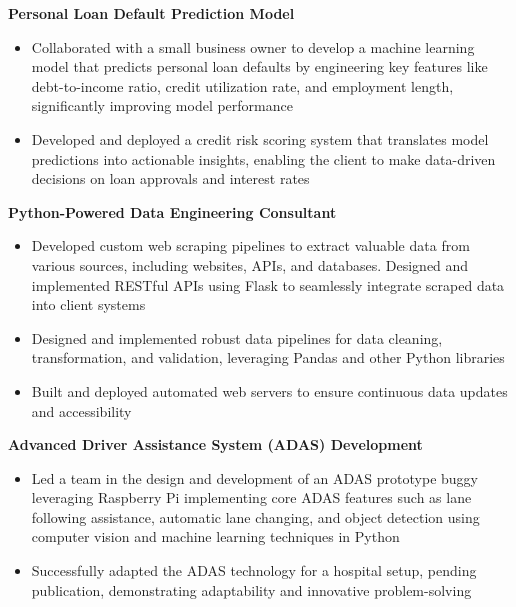 \documentclass[11pt]{article}       %
\begin{document}
\textbf{Personal Loan Default Prediction Model} \\
\vspace{-9pt}
\begin{itemize}
  \item Collaborated with a small business owner to develop a machine learning model that predicts personal loan defaults by engineering key features like debt-to-income ratio, credit utilization rate, and employment length, significantly improving model performance
  \item Developed and deployed a credit risk scoring system that translates model predictions into actionable insights, enabling the client to make data-driven decisions on loan approvals and interest rates
\end{itemize}
\textbf{Python-Powered Data Engineering Consultant} \\
\vspace{-9pt}
\begin{itemize}
  \item Developed custom web scraping pipelines to extract valuable data from various sources, including websites, APIs, and databases. Designed and implemented RESTful APIs using Flask to seamlessly integrate scraped data into client systems
  \item Designed and implemented robust data pipelines for data cleaning, transformation, and validation, leveraging Pandas and other Python libraries
  \item Built and deployed automated web servers to ensure continuous data updates and accessibility
\end{itemize}
\textbf{Advanced Driver Assistance System (ADAS) Development} \\
\vspace{-9pt}
\begin{itemize}
  \item Led a team in the design and development of an ADAS prototype buggy leveraging Raspberry Pi implementing core ADAS features such as lane following assistance, automatic lane changing, and object detection using computer vision and machine learning techniques in Python
  \item Successfully adapted the ADAS technology for a hospital setup, pending publication, demonstrating adaptability and innovative problem-solving
\end{itemize}

\vspace{-18.5pt}
\end{document}
